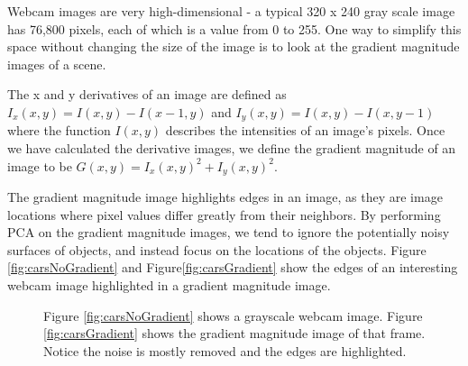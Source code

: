 Webcam images are very high-dimensional - a typical 320 x 240 gray scale image has 76,800 pixels, each of
which is a value from 0 to 255.  One way to simplify this space without changing the size of the image is to look at the gradient magnitude images of a scene.  

The x and y derivatives of an image are defined as $I_x(x,y) = I(x,y)-I(x-1,y)$ and $I_y(x,y) = I(x,y)-I(x,y-1)$ where the function $I(x,y)$ describes the intensities of an image's pixels.  Once we have calculated the derivative images, we define the gradient magnitude of an image to be $G(x,y) = I_x(x,y)^2 + I_y(x,y)^2$.

The gradient magnitude image highlights edges in an image, as they are image locations where pixel values differ greatly from their neighbors.  By performing PCA on the gradient magnitude images, we tend to ignore the potentially noisy surfaces of objects, and instead focus on the locations of the objects.  Figure \ref{fig:carsNoGradient} and Figure\ref{fig:carsGradient} show the edges of an interesting webcam image highlighted in a gradient magnitude image.


\begin{figure}[ht]
	\centering
		\caption[Focusing on object edges with gradient magnitude images.]{Figure \ref{fig:carsNoGradient} shows a grayscale webcam image. Figure \ref{fig:carsGradient} shows the gradient magnitude image of that frame.  Notice the noise is mostly removed and the edges are highlighted.}
\end{figure}

